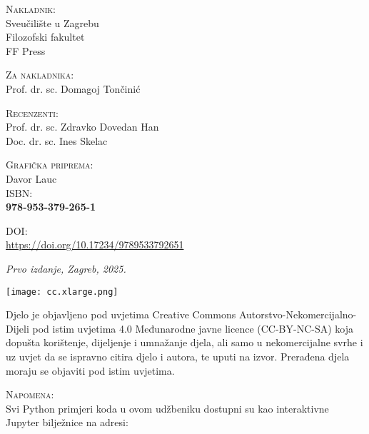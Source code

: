 \documentclass[11pt,a4paper,twoside,openright]{book}
\theoremstyle{definition}
\theoremstyle{plain}
\theoremstyle{remark}
\begin{document}
\frontmatter

\newpage
\thispagestyle{empty}
\vspace*{\fill}
\noindent
\setlength{\parindent}{0pt}
\setlength{\parskip}{\baselineskip}

\textsc{Nakladnik}: \\
Sveučilište u Zagrebu \\
Filozofski fakultet \\
FF Press \\
\vspace{0.4cm}

\textsc{Za nakladnika}:\\
Prof. dr. sc. Domagoj Tončinić \\
\vspace{0.4cm}

\textsc{Recenzenti}: \\
Prof. dr. sc. Zdravko Dovedan Han \\
Doc. dr. sc. Ines Skelac \\
\vspace{0.4cm}

\textsc{Grafička priprema}: \\
Davor Lauc \\

\vspace{0.7cm}
\textsc{ISBN:} \\ {\bfseries 978-953-379-265-1}
\vspace{0.3cm}

\textsc{DOI:} \\ \url{https://doi.org/10.17234/9789533792651}

\vspace{0.3cm}
\textit{Prvo izdanje, Zagreb, 2025.}

\vspace{0.4cm}
 \texttt{[image: cc.xlarge.png]} 
\vspace{0.3cm}

Djelo je objavljeno pod uvjetima Creative Commons Autorstvo-Nekomercijalno-Dijeli pod istim uvjetima 4.0 Međunarodne javne licence (CC-BY-NC-SA) koja dopušta korištenje, dijeljenje i umnažanje djela, ali samo u nekomercijalne svrhe i uz uvjet da se ispravno citira djelo i autora, te uputi na izvor.
Prerađena djela moraju se objaviti pod istim uvjetima.
\vspace{0.3cm}

\textsc{Napomena}: \\
Svi Python primjeri koda u ovom udžbeniku dostupni su kao interaktivne Jupyter bilježnice na adresi: \\
\end{document}
